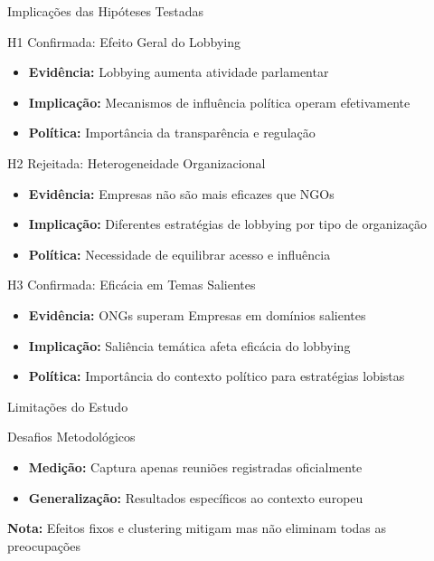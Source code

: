 \documentclass[aspectratio=169]{beamer}
\begin{document}
\begin{frame}{Implicações das Hipóteses Testadas}
\begin{block}{H1 Confirmada: Efeito Geral do Lobbying}
\begin{itemize}
\item \textbf{Evidência:} Lobbying aumenta atividade parlamentar
\item \textbf{Implicação:} Mecanismos de influência política operam efetivamente
\item \textbf{Política:} Importância da transparência e regulação
\end{itemize}
\end{block}

\begin{block}{H2 Rejeitada: Heterogeneidade Organizacional}
\begin{itemize}
\item \textbf{Evidência:} Empresas não são mais eficazes que NGOs
\item \textbf{Implicação:} Diferentes estratégias de lobbying por tipo de organização
\item \textbf{Política:} Necessidade de equilibrar acesso e influência
\end{itemize}
\end{block}

\begin{block}{H3 Confirmada: Eficácia em Temas Salientes}
\begin{itemize}
\item \textbf{Evidência:} ONGs superam Empresas em domínios salientes
\item \textbf{Implicação:} Saliência temática afeta eficácia do lobbying
\item \textbf{Política:} Importância do contexto político para estratégias lobistas
\end{itemize}
\end{block}
\end{frame}

\begin{frame}{Limitações do Estudo}
\begin{block}{Desafios Metodológicos}
\begin{itemize}
\item \textbf{Medição:} Captura apenas reuniões registradas oficialmente
\item \textbf{Generalização:} Resultados específicos ao contexto europeu
\end{itemize}
\end{block}

\vspace{0.3cm}

\textbf{Nota:} Efeitos fixos e clustering mitigam mas não eliminam todas as preocupações
\end{frame}
\end{document}
